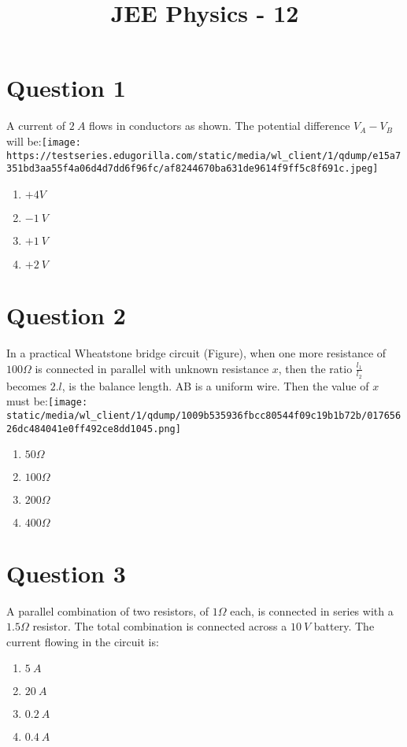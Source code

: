 \documentclass{article}
\title{JEE Physics - 12 }
\begin{document}
                    \maketitle
                    \section*{Question 1}
A current of \(2~ A\) flows in conductors as shown. The potential difference \(V_A-V_B\) will be:\newline\texttt{[image: https://testseries.edugorilla.com/static/media/wl\_client/1/qdump/e15a7351bd3aa55f4a06d4d7dd6f96fc/af8244670ba631de9614f9ff5c8f691c.jpeg]}
\begin{enumerate}[label=(\alph*)]
\item \(+4 V\)
\item \(-1 {~V}\)
\item \(+1 {~V}\)
\item \(+2 {~V}\)
\end{enumerate}
\newpage
\section*{Question 2}
In a practical Wheatstone bridge circuit (Figure), when one more resistance of \(100 \Omega\) is connected in parallel with unknown resistance \(x\), then the ratio \(\frac{l_1}{l_2}\) becomes \(2 . l\), is the balance length. AB is a uniform wire. Then the value of \(x\) must be:\texttt{[image: static/media/wl\_client/1/qdump/1009b535936fbcc80544f09c19b1b72b/01765626dc484041e0ff492ce8dd1045.png]}
\begin{enumerate}[label=(\alph*)]
\item \(50 \Omega\)
\item \(100 \Omega\)
\item \(200 \Omega\)
\item \(400 \Omega\)
\end{enumerate}
\newpage
\section*{Question 3}
A parallel combination of two resistors, of \(1 \Omega\) each, is connected in series with a \(1.5 \Omega\) resistor. The total combination is connected across a \(10 {~V}\) battery. The current flowing in the circuit is:
\begin{enumerate}[label=(\alph*)]
\item \(5 {~A}\)
\item \(20 {~A}\)
\item \(0.2 {~A}\)
\item \(0.4 {~A}\)
\end{enumerate}
\newpage
\end{document}

